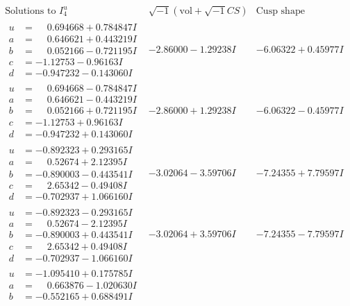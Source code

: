 \documentclass[1p]{elsarticle_modified}
\theoremstyle{definition}
\newcommand{\I}{\sqrt{-1}}
\begin{document}
$$\begin{array}{c|c|c}  
\text{Solutions to }I^u_{4}& \I (\text{vol} + \sqrt{-1}CS) & \text{Cusp shape}\\
 \hline 
\begin{aligned}
u &= \phantom{-}0.694668 + 0.784847 I \\
a &= \phantom{-}0.646621 + 0.443219 I \\
b &= \phantom{-}0.052166 - 0.721195 I \\
c &= -1.12753 - 0.96163 I \\
d &= -0.947232 - 0.143060 I\end{aligned}
 & -2.86000 - 1.29238 I & -6.06322 + 0.45977 I \\ \hline\begin{aligned}
u &= \phantom{-}0.694668 - 0.784847 I \\
a &= \phantom{-}0.646621 - 0.443219 I \\
b &= \phantom{-}0.052166 + 0.721195 I \\
c &= -1.12753 + 0.96163 I \\
d &= -0.947232 + 0.143060 I\end{aligned}
 & -2.86000 + 1.29238 I & -6.06322 - 0.45977 I \\ \hline\begin{aligned}
u &= -0.892323 + 0.293165 I \\
a &= \phantom{-}0.52674 + 2.12395 I \\
b &= -0.890003 - 0.443541 I \\
c &= \phantom{-}2.65342 - 0.49408 I \\
d &= -0.702937 + 1.066160 I\end{aligned}
 & -3.02064 - 3.59706 I & -7.24355 + 7.79597 I \\ \hline\begin{aligned}
u &= -0.892323 - 0.293165 I \\
a &= \phantom{-}0.52674 - 2.12395 I \\
b &= -0.890003 + 0.443541 I \\
c &= \phantom{-}2.65342 + 0.49408 I \\
d &= -0.702937 - 1.066160 I\end{aligned}
 & -3.02064 + 3.59706 I & -7.24355 - 7.79597 I \\ \hline\begin{aligned}
u &= -1.095410 + 0.175785 I \\
a &= \phantom{-}0.663876 - 1.020630 I \\
b &= -0.552165 + 0.688491 I \\

\end{aligned}
\end{array}$$
\end{document}
